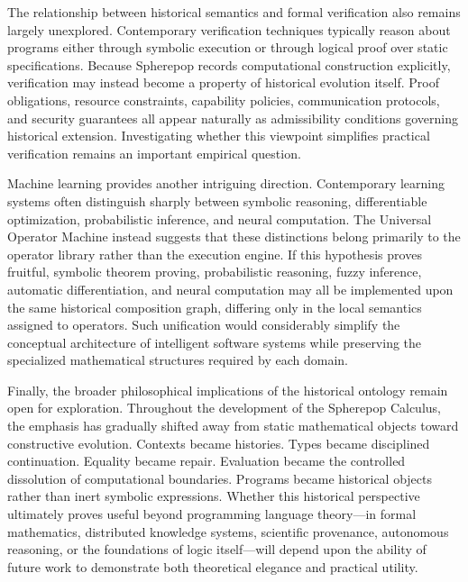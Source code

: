 \documentclass[12pt,oneside]{article}
\theoremstyle{definition}
\theoremstyle{remark}
\begin{document}
The relationship between historical semantics and formal verification also
remains largely unexplored. Contemporary verification techniques typically
reason about programs either through symbolic execution or through logical
proof over static specifications. Because Spherepop records computational
construction explicitly, verification may instead become a property of
historical evolution itself. Proof obligations, resource constraints,
capability policies, communication protocols, and security guarantees all
appear naturally as admissibility conditions governing historical extension.
Investigating whether this viewpoint simplifies practical verification remains
an important empirical question.

Machine learning provides another intriguing direction. Contemporary learning
systems often distinguish sharply between symbolic reasoning, differentiable
optimization, probabilistic inference, and neural computation. The Universal
Operator Machine instead suggests that these distinctions belong primarily to
the operator library rather than the execution engine. If this hypothesis
proves fruitful, symbolic theorem proving, probabilistic reasoning, fuzzy
inference, automatic differentiation, and neural computation may all be
implemented upon the same historical composition graph, differing only in the
local semantics assigned to operators. Such unification would considerably
simplify the conceptual architecture of intelligent software systems while
preserving the specialized mathematical structures required by each domain.

Finally, the broader philosophical implications of the historical ontology
remain open for exploration. Throughout the development of the Spherepop
Calculus, the emphasis has gradually shifted away from static mathematical
objects toward constructive evolution. Contexts became histories. Types became
disciplined continuation. Equality became repair. Evaluation became the
controlled dissolution of computational boundaries. Programs became historical
objects rather than inert symbolic expressions. Whether this historical
perspective ultimately proves useful beyond programming language theory—in
formal mathematics, distributed knowledge systems, scientific provenance,
autonomous reasoning, or the foundations of logic itself—will depend upon the
ability of future work to demonstrate both theoretical elegance and practical
utility.
\end{document}
